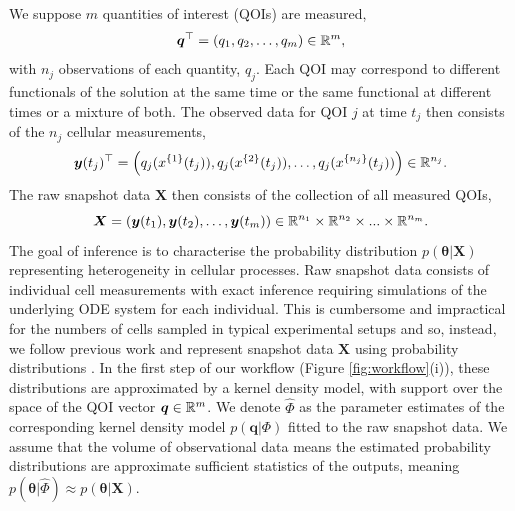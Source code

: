 We suppose $m$ quantities of interest (QOIs) are measured,
%
\begin{equation}
\boldsymbol{q}^\top = \left( q_1, q_2, \dots, q_m \right) \in \mathbb{R}^m,
\end{equation}
% 
with $n_j$ observations of each quantity, $q_j$. Each QOI may correspond to different functionals of the solution at the same time or the same functional at different times or a mixture of both. The observed data for QOI $j$ at time $t_j$ then consists of the $n_j$ cellular measurements,
%
\begin{equation}
\boldsymbol{y}(t_j)^\top = \left( q_j(x^{\{1\}}(t_j)), q_j(x^{\{2\}}(t_j)), \dots, q_j(x^{\{n_j\}}(t_j))  \right) \in \mathbb{R}^{n_j}.
\end{equation}
%
The raw snapshot data $\boldsymbol{X}$ then consists of the collection of all measured QOIs,
%
\begin{equation}
\boldsymbol{X} = \left( \boldsymbol{y}(t_1), \boldsymbol{y}(t_2), \dots, \boldsymbol{y}(t_m) \right) \in \mathbb{R}^{n_1} \times \mathbb{R}^{n_2}\times...\times\mathbb{R}^{n_m}.
\end{equation}
%
The goal of inference is to characterise the probability distribution $p(\boldsymbol{\theta}|\boldsymbol{X})$ representing heterogeneity in cellular processes. Raw snapshot data consists of individual cell measurements with exact inference requiring simulations of the underlying ODE system for each individual. This is cumbersome and impractical for the numbers of cells sampled in typical experimental setups and so, instead, we follow previous work and represent snapshot data $\boldsymbol{X}$ using probability distributions \cite{hasenauer2011identification,hasenauer2014ode,loos2018hierarchical,dixit2018maximum}. In the first step of our workflow (Figure \ref{fig:workflow}(i)), these distributions are approximated by a kernel density model, with support over the space of the QOI vector $\boldsymbol{q}\in\mathbb{R}^m$. We denote $\hat{\Phi}$ as the parameter estimates of the corresponding kernel density model $p(\boldsymbol{q}|\Phi)$ fitted to the raw snapshot data. We assume that the volume of observational data means the estimated probability distributions are approximate sufficient statistics of the outputs, meaning $p(\boldsymbol{\theta}|\hat{\Phi}) \approx p(\boldsymbol{\theta}|\boldsymbol{X})$.

